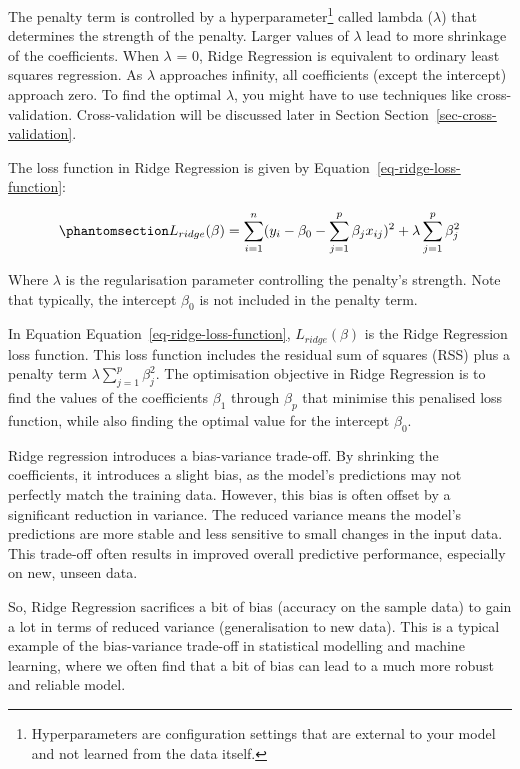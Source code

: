 \documentclass[
  letterpaper,
]{book}
\begin{document}
The penalty term is controlled by a hyperparameter\footnote{Hyperparameters
  are configuration settings that are external to your model and not
  learned from the data itself.} called lambda (\(\lambda\)) that
determines the strength of the penalty. Larger values of \(\lambda\)
lead to more shrinkage of the coefficients. When \(\lambda\) = 0, Ridge
Regression is equivalent to ordinary least squares regression. As
\(\lambda\) approaches infinity, all coefficients (except the intercept)
approach zero. To find the optimal \(\lambda\), you might have to use
techniques like cross-validation. Cross-validation will be discussed
later in Section Section~\ref{sec-cross-validation}.

The loss function in Ridge Regression is given by
Equation~\ref{eq-ridge-loss-function}:

\begin{equation}\phantomsection\label{eq-ridge-loss-function}{L_{ridge}(\beta) = \sum_{i=1}^{n} (y_i - \beta_0 - \sum_{j=1}^{p} \beta_j x_{ij})^2 + \lambda \sum_{j=1}^{p} \beta_j^2}\end{equation}

Where \(\lambda\) is the regularisation parameter controlling the
penalty's strength. Note that typically, the intercept \(\beta_0\) is
not included in the penalty term.

In Equation Equation~\ref{eq-ridge-loss-function}, \(L_{ridge}(\beta)\)
is the Ridge Regression loss function. This loss function includes the
residual sum of squares (RSS) plus a penalty term
\(\lambda \sum_{j=1}^p \beta_j^2\). The optimisation objective in Ridge
Regression is to find the values of the coefficients \(\beta_1\) through
\(\beta_p\) that minimise this penalised loss function, while also
finding the optimal value for the intercept \(\beta_0\).

Ridge regression introduces a bias-variance trade-off. By shrinking the
coefficients, it introduces a slight bias, as the model's predictions
may not perfectly match the training data. However, this bias is often
offset by a significant reduction in variance. The reduced variance
means the model's predictions are more stable and less sensitive to
small changes in the input data. This trade-off often results in
improved overall predictive performance, especially on new, unseen data.

So, Ridge Regression sacrifices a bit of bias (accuracy on the sample
data) to gain a lot in terms of reduced variance (generalisation to new
data). This is a typical example of the bias-variance trade-off in
statistical modelling and machine learning, where we often find that a
bit of bias can lead to a much more robust and reliable model.
\end{document}
